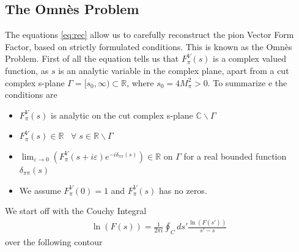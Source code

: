 \documentclass[a4paper]{article}
\begin{document}
\subsection{The Omn\`es Problem}
The equations \ref{eq:rec} allow us to carefully reconstruct the pion Vector Form
Factor, based on strictly formulated conditions. This is known as the Omn\`es
Problem. First of all the equation tells us that $F_\pi^V(s)$ is a complex
valued function, as $s$ is an analytic variable in the complex plane, apart
from a cut complex s-plane $\Gamma = [s_0, \infty) \subset \mathbb{R}$, where
$s_0 = 4M_\pi^2 > 0$. To summarize e the conditions are
\begin{itemize}
    \item $F_\pi^V(s)$ is analytic on the cut complex s-plane
        $\mathbb{C}\backslash \Gamma$
    \item $F_\pi^V(s)\in \mathbb{R} \;\;\; \forall\; s \in
        \mathbb{R}\backslash \Gamma$
    \item $\lim_{\varepsilon \rightarrow 0}(F_\pi^V(s+i\varepsilon)
        e^{-i\delta_{\pi\pi}(s)}) \in \mathbb{R}$ on $\Gamma$ for a real
        bounded function $\delta_{\pi\pi}(s)$
    \item We assume $F_\pi^V(0) = 1$ and $F_\pi^V(s)$ has no zeros.
\end{itemize}
We start off with the Couchy Integral
\begin{align}
    \ln(F(s)) = \frac{1}{2\pi i}\oint_C ds' \frac{\ln(F(s'))}{s'-s}
\end{align}
over the following contour
\begin{center}
\end{center}
\end{document}
